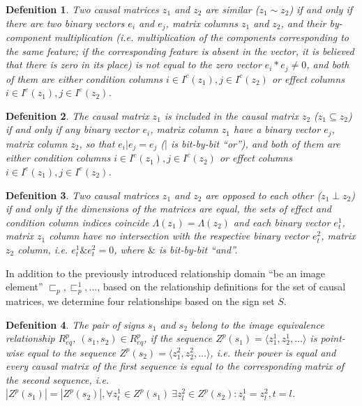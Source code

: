 \documentclass[review]{elsarticle}
\newtheorem{definition}{Defenition}
\begin{document}
\begin{definition}
	Two causal matrices $z_1$ and $z_2$ are similar ($z_1\sim z_2$) if and only if there are two binary vectors $e_i$ and $e_j$, matrix columns $z_1$ and $z_2$, and their by-component multiplication (i.e. multiplication of the components corresponding to the same feature; if the corresponding feature is absent in the vector, it is believed that there is zero in its place) is not equal to the zero vector $e_i*e_j\not = 0$, and both of them are either condition columns $i\in I^c(z_1), j\in I^c(z_2)$ or effect columns $i\in I^e(z_1), j\in I^e(z_2)$.
\end{definition}

\begin{definition}
	The causal matrix $z_1$ is included in the causal matrix $z_2$ ($z_1\subseteq z_2$) if and only if any binary vector $e_i$, matrix column $z_1$ have a binary vector $e_j$, matrix column $z_2$, so that $e_i | e_j=e_j$ ($|$ is bit-by-bit ``or''), and both of them are either condition columns $i\in I^c(z_1), j\in I^c(z_2)$ or effect columns $i\in I^e(z_1), j\in I^e(z_2)$.
\end{definition}

\begin{definition}
	Two causal matrices  $z_1$ and $z_2$ are opposed to each other ($z_1\perp z_2$) if and only if the dimensions of the matrices are equal, the sets of effect and condition column indices coincide $\Lambda({z_1})=\Lambda({z_2})$ and each binary vector $e_t^1$, matrix $z_1$ column have no intersection with the respective binary vector $e_t^2$, matrix $z_2$ column, i.e. $e_t^1\& e_t^2=0$, where $\&$ is bit-by-bit ``and''.
\end{definition}

In addition to the previously introduced relationship domain ``be an image element'' ${\sqsubset_p, \sqsubset_p^1, \dots}$, based on the relationship definitions for the set of causal matrices, we determine four relationships based on the sign set $S$.

\begin{definition}
	The pair of signs $s_1$ and $s_2$ belong to \textit{the image equivalence relationship} $R_{eq}^p$, $(s_1,s_2)\in R_{eq}^p$, if the sequence $Z^p(s_1)=\langle z_1^1,z_2^1,\dots\rangle$ is point-wise equal to the sequence $Z^p(s_2)=\langle z_1^2,z_2^2,\dots\rangle$, i.e. their power is equal and every causal matrix of the first sequence is equal to the corresponding matrix of the second sequence, i.e. $|Z^p(s_1)| = |Z^p(s_2)|, \forall z_t^1\in Z^p(s_1)\ \exists z_l^2\in Z^p(s_2): z_t^1=z_l^2, t=l$.
\end{definition}
\end{document}
